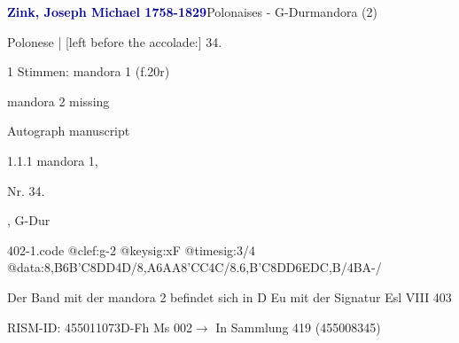 \documentclass[twocolumn]{book}
\begin{document}
\par \vspace{7pt} \textcolor{darkblue}{\textbf{Zink, Joseph Michael  1758-1829}}\hfillplus{\textbf{[402]}}\newline Polonaises - G-Dur\newline mandora (2)
\par \begin{itshape}[f.20r, at left:] Polonese | [left before the accolade:] 34.\end{itshape} 
\par \textcolor{darkblue}{}  1 Stimmen: mandora 1  (f.20r)\newline \begin{small} mandora 2 missing\end{small} \newline Autograph manuscript
\par 1.1.1  mandora 1, \begin{itshape}Nr. 34.\end{itshape}, G-Dur  
\begin{filecontents*}{402-1.code}
@clef:g-2
@keysig:xF
@timesig:3/4
@data:{8,B6B'C}8DD4D/{8,A6AA}{8'CC}4C/{8.6,B'C}8DD6EDC,B/4BA-/
\end{filecontents*}
\newline
%
\par Der Band mit der mandora 2 befindet sich in D Eu mit der Signatur Esl VIII 403
\par RISM-ID: 455011073\newline D-Fh  Ms 002\newline $\rightarrow$ In Sammlung 419 (455008345)
      
\end{document}
